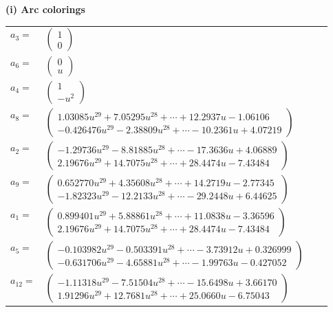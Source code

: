 \documentclass[1p]{elsarticle_modified}
\theoremstyle{definition}
\begin{document}
\flushleft \textbf{(i) Arc colorings}\\
\begin{tabular}{m{7pt} m{180pt} m{7pt} m{180pt} }
\flushright $a_{3}=$&$\begin{pmatrix}1\\0\end{pmatrix}$ \\
\flushright $a_{6}=$&$\begin{pmatrix}0\\u\end{pmatrix}$ \\
\flushright $a_{4}=$&$\begin{pmatrix}1\\- u^2\end{pmatrix}$ \\
\flushright $a_{8}=$&$\begin{pmatrix}1.03085 u^{29}+7.05295 u^{28}+\cdots+12.2937 u-1.06106\\-0.426476 u^{29}-2.38809 u^{28}+\cdots-10.2361 u+4.07219\end{pmatrix}$ \\
\flushright $a_{2}=$&$\begin{pmatrix}-1.29736 u^{29}-8.81885 u^{28}+\cdots-17.3636 u+4.06889\\2.19676 u^{29}+14.7075 u^{28}+\cdots+28.4474 u-7.43484\end{pmatrix}$ \\
\flushright $a_{9}=$&$\begin{pmatrix}0.652770 u^{29}+4.35608 u^{28}+\cdots+14.2719 u-2.77345\\-1.82323 u^{29}-12.2133 u^{28}+\cdots-29.2448 u+6.44625\end{pmatrix}$ \\
\flushright $a_{1}=$&$\begin{pmatrix}0.899401 u^{29}+5.88861 u^{28}+\cdots+11.0838 u-3.36596\\2.19676 u^{29}+14.7075 u^{28}+\cdots+28.4474 u-7.43484\end{pmatrix}$ \\
\flushright $a_{5}=$&$\begin{pmatrix}-0.103982 u^{29}-0.503391 u^{28}+\cdots-3.73912 u+0.326999\\-0.631706 u^{29}-4.65881 u^{28}+\cdots-1.99763 u-0.427052\end{pmatrix}$ \\
\flushright $a_{12}=$&$\begin{pmatrix}-1.11318 u^{29}-7.51504 u^{28}+\cdots-15.6498 u+3.66170\\1.91296 u^{29}+12.7681 u^{28}+\cdots+25.0660 u-6.75043\end{pmatrix}$ \\

\end{tabular}
\end{document}
